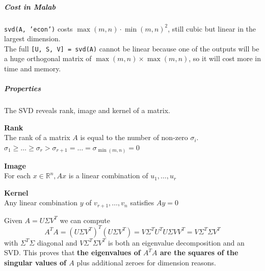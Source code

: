 \documentclass[10pt]{report}
\begin{document}
\subparagraph{Cost in Malab} \texttt{svd(A, 'econ')} costs $\max(m,n)\cdot \min(m,n)^2$, still cubic but linear in the largest dimension.\\
The full \texttt{[U, S, V] = svd(A)} cannot be linear because one of the outputs will be a huge orthogonal matrix of $\max(m,n)\times \max(m,n)$, so it will cost more in time and memory.
\subparagraph{Properties} The SVD reveals rank, image and kernel of a matrix.
\begin{list}{}{}
	\item \textbf{Rank}\\
The rank of a matrix $A$ is equal to the number of non-zero $\sigma_i$. $\sigma_1\geq \ldots\geq\sigma_r > \sigma_{r+1} = \ldots = \sigma_{\min(m,n)} = 0$
	\item \textbf{Image}\\
	For each $x\in\mathbb{R}^n, Ax$ is a linear combination of $u_1,\ldots,u_r$
	\item \textbf{Kernel}\\
	Any linear combination $y$ of $v_{r+1},\ldots,v_n$ satisfies $Ay = 0$
\end{list}
Given $A = U\Sigma V^T$ we can compute $$A^T A = (U\Sigma V^T)^T(U\Sigma V^T) = V\Sigma^T U^T U \Sigma VV^T = V\Sigma^T \Sigma V^T$$ with $\Sigma^T \Sigma$ diagonal and $V\Sigma^T \Sigma V^T$ is both an eigenvalue decomposition and an SVD. This proves that \textbf{the eigenvalues of $A^T A$ are the squares of the singular values of $A$} plus additional zeroes for dimension reasons.
\end{document}
